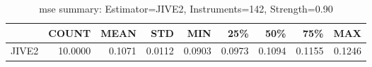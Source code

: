 \begin{table}[ht]
\centering
\caption{mse summary: Estimator=JIVE2, Instruments=142, Strength=0.90}
\begin{tabular}{lrrrrrrrr}
\toprule
 & COUNT & MEAN & STD & MIN & 25\% & 50\% & 75\% & MAX \\
\midrule
JIVE2 & 10.0000 & 0.1071 & 0.0112 & 0.0903 & 0.0973 & 0.1094 & 0.1155 & 0.1246 \\
\bottomrule
\end{tabular}
\end{table}
